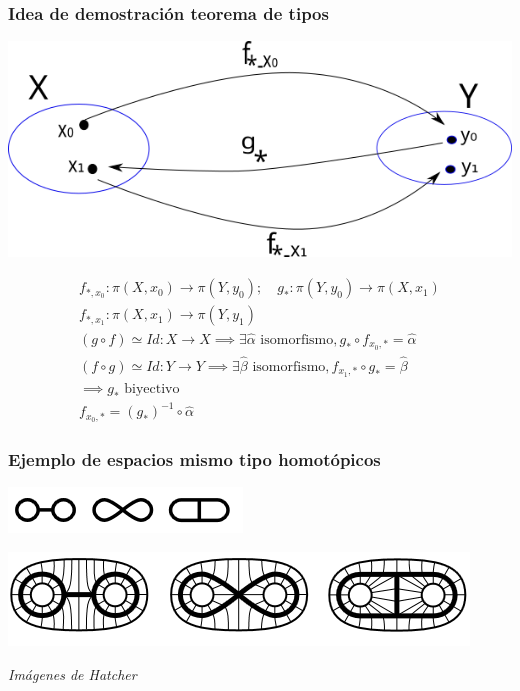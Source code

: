 \documentclass[xetex,mathserif,serif]{beamer}
\begin{document}
  \begin{frame}
    \frametitle{Idea de demostración teorema de tipos}
    \begin{center}
      \includegraphics[scale=0.5]{./imag/teo_tipos.png}
    \end{center}
    \begin{gather*}
      f_{*,x_0} : \pi (X, x_0) \to \pi (Y, y_0) ;\quad
      g_* : \pi (Y, y_0) \to \pi (X, x_1) \\
      f_{*,x_1} : \pi (X, x_1) \to \pi (Y, y_1) \\
      (g \circ f) \simeq Id : X \to X
      \implies \exists \hat \alpha \text{ isomorfismo}, g_* \circ
      f_{x_0, *} = \hat \alpha \\
      (f \circ g) \simeq Id : Y \to Y
      \implies \exists \hat \beta \text{ isomorfismo}, f_{x_1, *} \circ
      g_* = \hat \beta \\
      \implies g_* \text{ biyectivo } \\
      f_{x_0, *} = \left( g_* \right)^{-1} \circ \hat \alpha
    \end{gather*}
  \end{frame}

  \begin{frame}
    \frametitle{Ejemplo de espacios mismo tipo homotópicos}
    \begin{block}{}
      \centering
      \includegraphics{./imag/ThreeNonHomeoButHomotopyEquivGraphs.png}
    \end{block}

    \begin{block}{}
      \centering
      \includegraphics[scale=0.5]{./imag/HomotopyEquivalentsToBiAnnulus.png}
    \end{block}
    \begin{center}
      \emph{Imágenes de Hatcher}
    \end{center}

  \end{frame}
\end{document}
